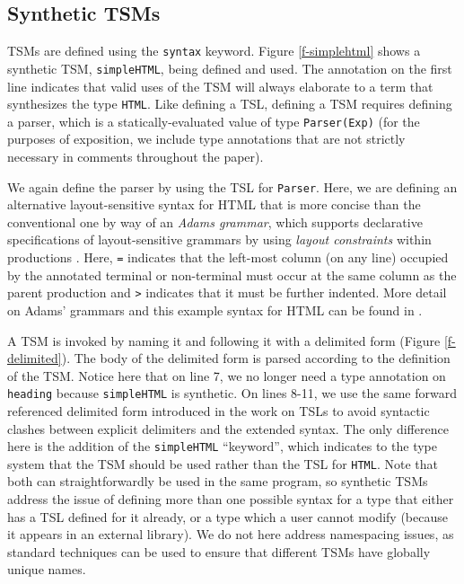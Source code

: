 \documentclass{sig-alternate}
\begin{document}
\subsection{Synthetic TSMs}
TSMs are defined using the \verb|syntax| keyword. Figure \ref{f-simplehtml} shows a synthetic TSM, \verb|simpleHTML|, being defined and used. The annotation on the first line indicates that valid uses of the TSM will always elaborate to a term that synthesizes the type \verb|HTML|. Like defining a TSL, defining a TSM requires defining a parser, which is a statically-evaluated value of type \verb|Parser(Exp)| (for the purposes of exposition, we include type annotations that are not strictly necessary in comments throughout the paper). 

We again define the parser by using the TSL for \verb|Parser|. Here, we are defining an alternative layout-sensitive syntax for HTML that is more concise than the conventional one by way of an \emph{Adams grammar}, which supports declarative specifications of layout-sensitive grammars by using \emph{layout constraints} within productions \cite{Adams:2013:PPI:2429069.2429129}. Here, \verb|=| indicates that the left-most column (on any line) occupied by the annotated terminal or non-terminal must occur at the same column as the parent production and \verb|>| indicates that it must be further indented. More detail on Adams' grammars and this example syntax for HTML can be found in \cite{TSLs}. 

A TSM is invoked by naming it and following it with a delimited form (Figure \ref{f-delimited}). The body of the delimited form is parsed according to the definition of the TSM. Notice here that on line 7, we no longer need a type annotation on \verb|heading| because \verb|simpleHTML| is synthetic. On lines 8-11, we use the same forward referenced delimited form introduced in the work on TSLs to avoid syntactic clashes between explicit delimiters and the extended syntax. The only difference here is the addition of the \verb|simpleHTML| ``keyword'', which indicates to the type system that the TSM should be used rather than the TSL for \verb|HTML|. Note that both can straightforwardly be used in the same program, so synthetic TSMs address the issue of defining more than one possible syntax for a type that either has a TSL defined for it already, or a type which a user cannot modify (because it appears in an external library). We do not here address namespacing issues, as standard techniques can be used to ensure that different TSMs have globally unique names. 
\end{document}
